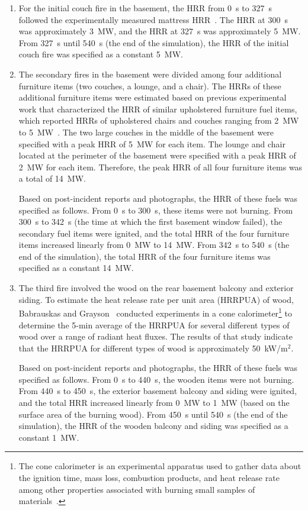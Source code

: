 \documentclass[12pt,oneside]{book}
\begin{document}
\begin{enumerate}
\item For the initial couch fire in the basement, the HRR from 0~s to 327~s followed the experimentally measured mattress HRR~\cite{madrzykowski2009fire}. The HRR at 300~s was approximately 3~MW, and the HRR at 327~s was approximately 5~MW. From 327~s until 540~s (the end of the simulation), the HRR of the initial couch fire was specified as a constant 5~MW.

\item The secondary fires in the basement were divided among four additional furniture items (two couches, a lounge, and a chair). The HRRs of these additional furniture items were estimated based on previous experimental work that characterized the HRR of similar upholstered furniture fuel items, which reported HRRs of upholstered chairs and couches ranging from 2~MW to 5~MW~\cite{madrzykowski2009fire,Madrzykowski:2,Babrauskas:1,Janssens:2012}. The two large couches in the middle of the basement were specified with a peak HRR of 5~MW for each item. The lounge and chair located at the perimeter of the basement were specified with a peak HRR of 2~MW for each item. Therefore, the peak HRR of all four furniture items was a total of 14~MW.

Based on post-incident reports and photographs, the HRR of these fuels was specified as follows. From 0~s to 300~s, these items were not burning. From 300~s to 342~s (the time at which the first basement window failed), the secondary fuel items were ignited, and the total HRR of the four furniture items increased linearly from 0~MW to 14~MW. From 342~s to 540~s (the end of the simulation), the total HRR of the four furniture items was specified as a constant 14~MW.

\item The third fire involved the wood on the rear basement balcony and exterior siding. To estimate the heat release rate per unit area (HRRPUA) of wood, Babrauskas and Grayson~\cite{babrauskas1990} conducted experiments in a cone calorimeter\footnote{The cone calorimeter is an experimental apparatus used to gather data about the ignition time, mass loss, combustion products, and heat release rate among other properties associated with burning small samples of materials~\cite{ASTM:E1355}.} to determine the 5-min average of the HRRPUA for several different types of wood over a range of radiant heat fluxes. The results of that study indicate that the HRRPUA for different types of wood is approximately 50~kW/m$^2$.

Based on post-incident reports and photographs, the HRR of these fuels was specified as follows. From 0~s to 440~s, the wooden items were not burning. From 440~s to 450~s, the exterior basement balcony and siding were ignited, and the total HRR increased linearly from 0~MW to 1~MW (based on the surface area of the burning wood). From 450~s until 540~s (the end of the simulation), the HRR of the wooden balcony and siding was specified as a constant 1~MW.
\end{enumerate}
\end{document}

